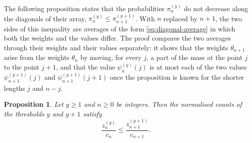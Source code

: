 \documentclass{amsart}
\newtheorem{proposition}[theorem]{Proposition}
\theoremstyle{definition}
\theoremstyle{remark}
\numberwithin{equation}{section}
\begin{document}
The following proposition states that the probabilities $\pi^{(y)}_n$ do
not decrease along the diagonals of their array,
$\pi^{(y)}_n\le\pi^{(y+1)}_{n+1}$. With $n$ replaced by $n+1$, the two sides
of this inequality are averages of the form \eqref{eq:diagonal-average} in
which both the weights and the values differ.
The proof compares the two averages through their weights and their values
separately: it shows that the weights
$\theta_{n+1}$ arise from the weights $\theta_n$ by moving, for every $j$,
a part of the mass at the point $j$ to the point $j+1$, and that the value
$\psi^{(y)}_n(j)$ is at most each of the two values $\psi^{(y+1)}_{n+1}(j)$
and $\psi^{(y+1)}_{n+1}(j+1)$ once the proposition is known for the
shorter lengths $j$ and $n-j$.

\begin{proposition}\label{prop:diagonalmonotone}
Let $y\ge1$ and $n\ge0$ be integers. Then the normalised counts of the
thresholds $y$ and $y+1$ satisfy
\[
\frac{z^{(y)}_n}{c_n}\le\frac{z^{(y+1)}_{n+1}}{c_{n+1}}.
\]
\end{proposition}
\end{document}
